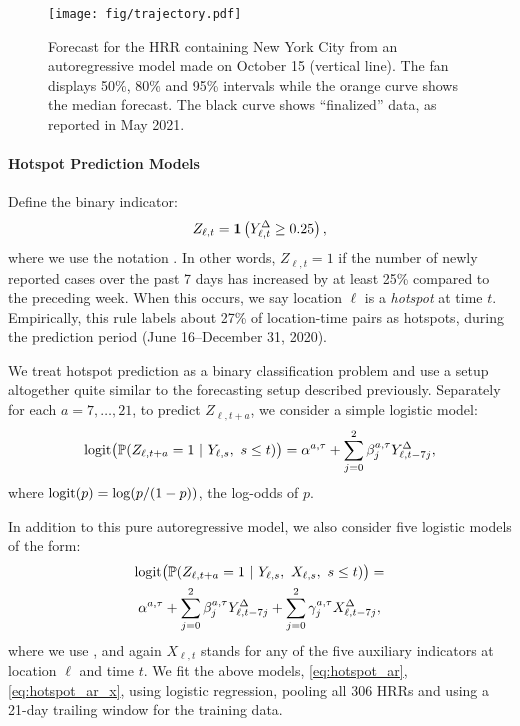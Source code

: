 \documentclass[9pt,twocolumn,twoside,lineno]{pnas-new}
\begin{document}
\begin{figure}[t]
\texttt{[image: fig/trajectory.pdf]}
\caption{Forecast for the HRR containing New York City from an autoregressive
  model made on October 15 (vertical line).  The fan displays 50\%, 80\% and
  95\% intervals while the orange curve shows the median forecast. The black
  curve shows ``finalized'' data, as reported in May 2021.}   
\label{fig:trajectory}
\end{figure}

\paragraph{Hotspot Prediction Models}

Define the binary indicator:
$$
Z_{\ell,t} = \mathbf{1}\left(Y^\Delta_{\ell,t} \geq 0.25\right),
$$
where we use the notation . In other words, $Z_{\ell,t}=1$ if the number of
newly reported cases over the past 7 days has increased by at least 25\%
compared to the preceding week.  When this occurs, we say location $\ell$ is a
\textit{hotspot} at time $t$.  Empirically, this rule labels about 27\% of
location-time pairs as hotspots, during the prediction period (June 16--December
31, 2020).   

We treat hotspot prediction as a binary classification problem and use a setup 
altogether quite similar to the forecasting setup described previously.
Separately for each $a=7,\ldots,21$, to predict $Z_{\ell,t+a}$, we consider a
simple logistic model:
\begin{equation}
\label{eq:hotspot_ar}
\mathrm{logit} \big( \mathbb{P}(Z_{\ell,t+a} = 1 \ | \ Y_{\ell,s},\ s \leq t) \big) 
= \alpha^{a,\tau} + \sum_{j=0}^2 \beta^{a,\tau}_j Y^\Delta_{\ell,t-7j},
\end{equation}
where $\mathrm{logit}(p) = \log(p/(1-p))$, the log-odds of $p$.

In addition to this pure autoregressive model, we also consider five
logistic models of the form:  
\begin{multline}
\label{eq:hotspot_ar_x}
\mathrm{logit} \big( \mathbb{P}(Z_{\ell,t+a} = 1 \ | \ Y_{\ell,s},\ X_{\ell,s},\ s \leq t) \big)
= \\ \alpha^{a,\tau} + \sum_{j=0}^2 \beta^{a,\tau}_j Y^\Delta_{\ell,t-7j} +  
\sum_{j=0}^2 \gamma^{a,\tau}_j X^\Delta_{\ell,t-7j},
\end{multline}
where we use , and again $X_{\ell,t}$ stands for any of the five  
auxiliary indicators at location $\ell$ and time $t$.  We fit the above models,
\eqref{eq:hotspot_ar}, \eqref{eq:hotspot_ar_x}, using logistic regression,   
pooling all 306 HRRs and using a 21-day trailing window for the training data.   
\end{document}
